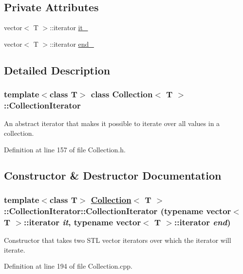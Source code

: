 \subsection*{Private Attributes}
\begin{CompactItemize}
\item 
vector$<$ T $>$::iterator \hyperlink{classCollection_1_1CollectionIterator_r0}{it\_\-}
\item 
vector$<$ T $>$::iterator \hyperlink{classCollection_1_1CollectionIterator_r1}{end\_\-}
\end{CompactItemize}


\subsection{Detailed Description}
\subsubsection*{template$<$class T$>$ class Collection$<$ T $>$::Collection\-Iterator}

An abstract iterator that makes it possible to iterate over all values in a collection. 



Definition at line 157 of file Collection.h.

\subsection{Constructor \& Destructor Documentation}
\hypertarget{classCollection_1_1CollectionIterator_a0}{
\subsubsection[CollectionIterator]{\setlength{\rightskip}{0pt plus 5cm}template$<$class T$>$ \hyperlink{classCollection}{Collection}$<$ T $>$::Collection\-Iterator::Collection\-Iterator (typename vector$<$ T $>$::iterator {\em it}, typename vector$<$ T $>$::iterator {\em end})}}
\label{classCollection_1_1CollectionIterator_a0}


Constructor that takes two STL vector iterators over which the iterator will iterate. 

Definition at line 194 of file Collection.cpp.

